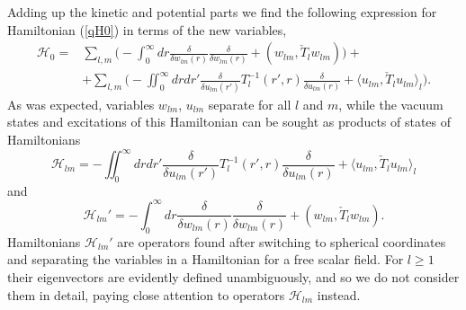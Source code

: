 \documentclass[12pt]{article}
\newcommand{\HH}{\mathscr{H}}
\begin{document}
	Adding up the kinetic and potential parts we find the following
	expression for Hamiltonian
(\ref{qH0})
	in terms of the new variables,
\begin{align*}
    \HH_{0} =& \sum_{l,m} \bigl( -\int_{0}^{\infty} dr
	\frac{\delta}{\delta w_{lm}(r)} \frac{\delta}{\delta w_{lm}(r)}
	    + (w_{lm},\check{T}_{l} w_{lm})\bigr)+\\
    &+ \sum_{l,m} \bigl(-\iint_{0}^{\infty} dr dr'
    \frac{\delta}{\delta u_{lm}(r')} T_{l}^{-1}(r',r)
	\frac{\delta}{\delta u_{lm}(r)}
	    + \langle u_{lm}, \check{T}_{l} u_{lm}\rangle_{l} \bigr).
\end{align*}
	As was expected, variables
$ w_{lm} $, 
$ u_{lm} $
	separate for all
$ l $ and $ m $,
	while the vacuum states and excitations of this Hamiltonian
	can be sought as products of states of Hamiltonians
\begin{equation*}
    \HH_{lm} = -\iint_{0}^{\infty} dr dr'
    \frac{\delta}{\delta u_{lm}(r')} T_{l}^{-1}(r',r)
	\frac{\delta}{\delta u_{lm}(r)}
	+ \langle u_{lm}, \check{T}_{l}u_{lm}\rangle_{l}
\end{equation*}
	and
\begin{equation*}
    \HH_{lm}' = -\int_{0}^{\infty} dr
	\frac{\delta}{\delta w_{lm}(r)} \frac{\delta}{\delta w_{lm}(r)}
	    + (w_{lm},\check{T}_{l} w_{lm}) .
\end{equation*}
	Hamiltonians
$ \HH_{lm}' $
	are operators found after switching to spherical coordinates
	and separating the variables in a Hamiltonian for
	a free scalar field.
	For
$ l \geq 1 $
    their eigenvectors are evidently defined unambiguously,
	and so we do not consider them in detail,
	paying close attention to operators
$ \HH_{lm} $ instead.



\end{document}
